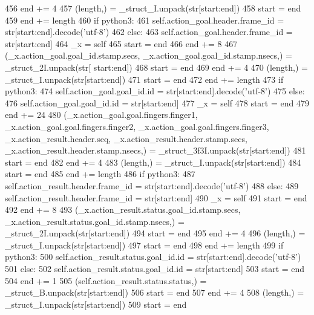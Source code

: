 \begin{DoxyCode}
456       end += 4
457       (length,) = \_struct\_I.unpack(str[start:end])
458       start = end
459       end += length
460       \textcolor{keywordflow}{if} python3:
461         self.action\_goal.header.frame\_id = str[start:end].decode(\textcolor{stringliteral}{'utf-8'})
462       \textcolor{keywordflow}{else}:
463         self.action\_goal.header.frame\_id = str[start:end]
464       \_x = self
465       start = end
466       end += 8
467       (\_x.action\_goal.goal\_id.stamp.secs, \_x.action\_goal.goal\_id.stamp.nsecs,) = \_struct\_2I.unpack(str[
      start:end])
468       start = end
469       end += 4
470       (length,) = \_struct\_I.unpack(str[start:end])
471       start = end
472       end += length
473       \textcolor{keywordflow}{if} python3:
474         self.action\_goal.goal\_id.id = str[start:end].decode(\textcolor{stringliteral}{'utf-8'})
475       \textcolor{keywordflow}{else}:
476         self.action\_goal.goal\_id.id = str[start:end]
477       \_x = self
478       start = end
479       end += 24
480       (\_x.action\_goal.goal.fingers.finger1, \_x.action\_goal.goal.fingers.finger2, 
      \_x.action\_goal.goal.fingers.finger3, \_x.action\_result.header.seq, \_x.action\_result.header.stamp.secs, 
      \_x.action\_result.header.stamp.nsecs,) = \_struct\_3f3I.unpack(str[start:end])
481       start = end
482       end += 4
483       (length,) = \_struct\_I.unpack(str[start:end])
484       start = end
485       end += length
486       \textcolor{keywordflow}{if} python3:
487         self.action\_result.header.frame\_id = str[start:end].decode(\textcolor{stringliteral}{'utf-8'})
488       \textcolor{keywordflow}{else}:
489         self.action\_result.header.frame\_id = str[start:end]
490       \_x = self
491       start = end
492       end += 8
493       (\_x.action\_result.status.goal\_id.stamp.secs, \_x.action\_result.status.goal\_id.stamp.nsecs,) = 
      \_struct\_2I.unpack(str[start:end])
494       start = end
495       end += 4
496       (length,) = \_struct\_I.unpack(str[start:end])
497       start = end
498       end += length
499       \textcolor{keywordflow}{if} python3:
500         self.action\_result.status.goal\_id.id = str[start:end].decode(\textcolor{stringliteral}{'utf-8'})
501       \textcolor{keywordflow}{else}:
502         self.action\_result.status.goal\_id.id = str[start:end]
503       start = end
504       end += 1
505       (self.action\_result.status.status,) = \_struct\_B.unpack(str[start:end])
506       start = end
507       end += 4
508       (length,) = \_struct\_I.unpack(str[start:end])
509       start = end

\end{DoxyCode}

